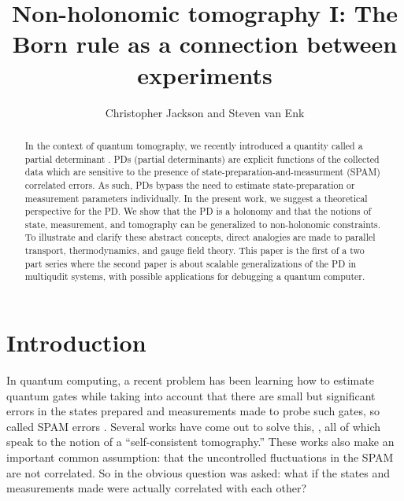 \documentclass[pra, 10pt, notitlepage, twocolumn]{revtex4-1}
\begin{document}
\title{Non-holonomic tomography I:  The Born rule as a connection between experiments}
\author{Christopher Jackson and Steven van Enk}

\begin{abstract}
In the context of quantum tomography, we recently introduced a quantity called a partial determinant \cite{jackson2015detecting}.
PDs (partial determinants) are explicit functions of the collected data which are sensitive to the presence of state-preparation-and-measurment (SPAM) correlated errors.
As such, PDs bypass the need to estimate state-preparation or measurement parameters individually.
In the present work, we suggest a theoretical perspective for the PD.
We show that the PD is a holonomy and that the notions of state, measurement, and tomography can be generalized to non-holonomic constraints.
To illustrate and clarify these abstract concepts, direct analogies are made to parallel transport, thermodynamics, and gauge field theory.
This paper is the first of a two part series where the second paper\cite{nonholo2} is about scalable generalizations of the PD in multiqudit systems,
with possible applications for debugging a quantum computer.
\end{abstract}

\maketitle







\section{Introduction}

In quantum computing, a recent problem has been learning how to estimate quantum gates
while taking into account that there are small but significant errors in the states prepared and measurements made to probe such gates,
so called SPAM errors \cite{merkel}.
Several works have come out to solve this, \cite{merkel,gst,stark}, all of which speak to the notion of a ``self-consistent tomography.''
These works also make an important common assumption: that the uncontrolled fluctuations in the SPAM are not correlated.
So in \cite{jackson2015detecting} the obvious question was asked: what if the states and measurements made were actually correlated with each other?
\end{document}
